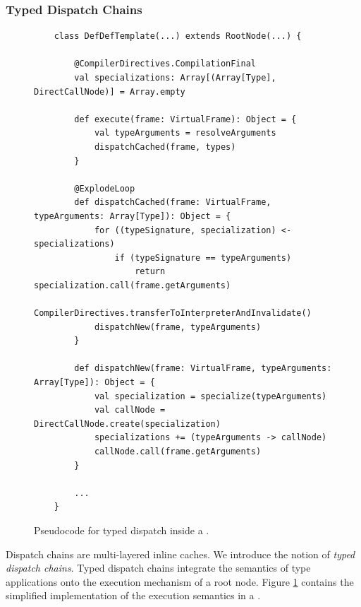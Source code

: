 \subsubsection*{Typed Dispatch Chains}

\begin{figure}[!htb]
	\begin{verbatim}
	class DefDefTemplate(...) extends RootNode(...) { 
			
		@CompilerDirectives.CompilationFinal
		val specializations: Array[(Array[Type], DirectCallNode)] = Array.empty
			
		def execute(frame: VirtualFrame): Object = {
			val typeArguments = resolveArguments
			dispatchCached(frame, types)
		}
			
		@ExplodeLoop
		def dispatchCached(frame: VirtualFrame, typeArguments: Array[Type]): Object = {
			for ((typeSignature, specialization) <- specializations)
				if (typeSignature == typeArguments)
					return specialization.call(frame.getArguments)
			CompilerDirectives.transferToInterpreterAndInvalidate()
			dispatchNew(frame, typeArguments)
		}
		
		def dispatchNew(frame: VirtualFrame, typeArguments: Array[Type]): Object = {
			val specialization = specialize(typeArguments)
			val callNode = DirectCallNode.create(specialization)
			specializations += (typeArguments -> callNode)
			callNode.call(frame.getArguments)
		}
		
		...
	}
	\end{verbatim}
	\caption{Pseudocode for typed dispatch inside a .}
	\label{impl:defdeftemplate-execute}
\end{figure}

Dispatch chains\cite{trufflyruby:specialization} are multi-layered inline caches.
We introduce the notion of \textit{typed dispatch chains}.
Typed dispatch chains integrate the semantics of type applications onto the execution mechanism of a root node.
Figure \ref{impl:defdeftemplate-execute} contains the simplified implementation of the execution semantics in a .

